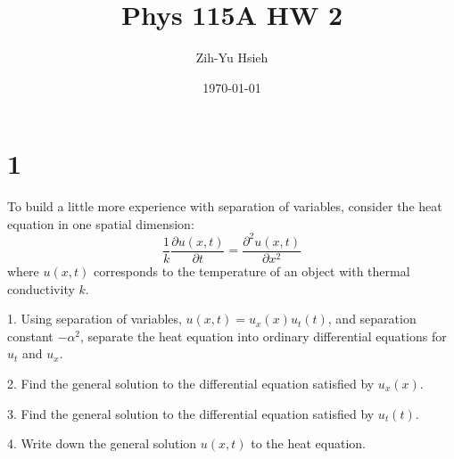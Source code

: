 \documentclass{article}
\title{Phys 115A HW 2}
\author{Zih-Yu Hsieh}
\date{\today}
\begin{document}
\maketitle

\section*{1}
\begin{ques}\label{q1}
To build a little more experience with separation of variables, consider the heat equation
in one spatial dimension:
\[
\frac{1}{k}\frac{\partial u(x, t)}{\partial t} = \frac{\partial^2 u(x, t)}{\partial x^2}
\]
where $u(x, t)$ corresponds to the temperature of an object with thermal conductivity $k$.

1. Using separation of variables, $u(x, t) = u_x(x)u_t(t)$, and separation constant $-\alpha^2$, separate the heat equation into ordinary differential equations for $u_t$ and $u_x$.

2. Find the general solution to the differential equation satisfied by $u_x(x)$.

3. Find the general solution to the differential equation satisfied by $u_t(t)$.

4. Write down the general solution $u(x, t)$ to the heat equation.
\end{ques}
\end{document}
